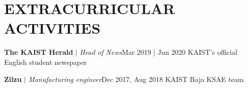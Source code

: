 \section{EXTRACURRICULAR ACTIVITIES}
\resumeSubHeadingListStart    
    \resumeProjectHeading
    {\textbf{The KAIST Herald} $|$ \emph{Head of News}}{Mar 2019 | Jun 2020}
    {KAIST's official English student newspaper}{}

    \resumeProjectHeading
    {\textbf{Zilzu} $|$ \emph{Manufacturing engineer}}{Dec 2017, Aug 2018}
    {KAIST Baja KSAE team}{}
\resumeSubHeadingListEnd